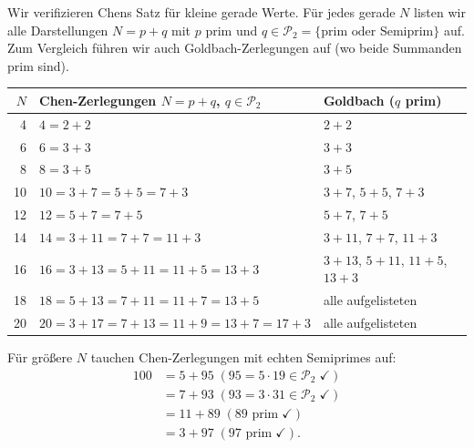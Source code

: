 \documentclass[12pt,a4paper]{amsart}
\theoremstyle{definition}
\newcommand{\Ptwo}{\mathcal{P}_2}
\begin{document}
Wir verifizieren Chens Satz für kleine gerade Werte.  Für jedes gerade $N$
listen wir alle Darstellungen $N = p + q$ mit $p$ prim und $q \in \Ptwo
= \{\text{prim oder Semiprim}\}$ auf.  Zum Vergleich führen wir auch
Goldbach-Zerlegungen auf (wo beide Summanden prim sind).

\begin{center}
\begin{tabular}{@{}r l l@{}}
\toprule
$N$ & Chen-Zerlegungen $N = p + q$, $q \in \Ptwo$ & Goldbach ($q$ prim) \\ \midrule
4   & $4 = 2 + 2$                                   & $2 + 2$ \\
6   & $6 = 3 + 3$                                   & $3 + 3$ \\
8   & $8 = 3 + 5$                                   & $3 + 5$ \\
10  & $10 = 3 + 7 = 5 + 5 = 7 + 3$                & $3+7$, $5+5$, $7+3$ \\
12  & $12 = 5 + 7 = 7 + 5$                         & $5+7$, $7+5$ \\
14  & $14 = 3 + 11 = 7 + 7 = 11 + 3$              & $3+11$, $7+7$, $11+3$ \\
16  & $16 = 3 + 13 = 5 + 11 = 11 + 5 = 13 + 3$   & $3+13$, $5+11$, $11+5$, $13+3$ \\
18  & $18 = 5 + 13 = 7 + 11 = 11 + 7 = 13 + 5$   & alle aufgelisteten \\
20  & $20 = 3 + 17 = 7 + 13 = 11 + 9 = 13 + 7 = 17 + 3$ & alle aufgelisteten \\
\bottomrule
\end{tabular}
\end{center}

Für größere $N$ tauchen Chen-Zerlegungen mit echten Semiprimes auf:
\begin{align*}
  100 &= 5 + 95\;(95 = 5 \cdot 19 \in \Ptwo\;{\checkmark}) \\
      &= 7 + 93\;(93 = 3 \cdot 31 \in \Ptwo\;{\checkmark}) \\
      &= 11 + 89\;(89 \text{ prim}\;{\checkmark}) \\
      &= 3 + 97\;(97 \text{ prim}\;{\checkmark}).
\end{align*}
\end{document}
